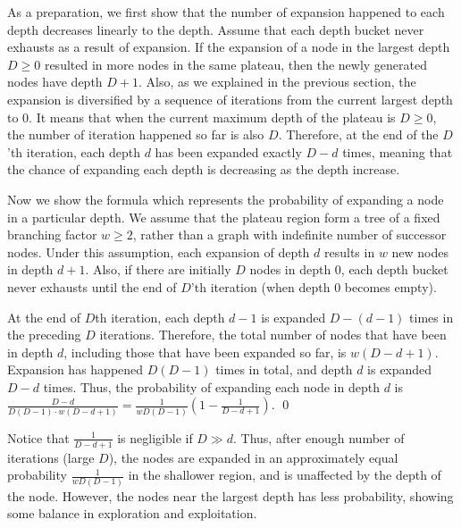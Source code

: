 As a preparation, we first show that the number of expansion happened to each depth decreases
linearly to the depth.
% 
Assume that each depth bucket never exhausts as a result of
expansion.  If the expansion of a node in the largest depth $D\geq 0$ resulted
in more nodes in the same plateau, then the newly generated nodes have
depth $D+1$.  Also, as we explained in the previous section, the
expansion is diversified by a sequence of iterations from the current
largest depth to 0.  It means that when the current maximum depth of
the plateau is $D\geq 0$, the number of iteration happened so far is also $D$.
Therefore, at the end of the $D$'th iteration, each depth $d$ has
been expanded exactly $D-d$ times, meaning that the chance of
expanding each depth is decreasing as the depth increase.

Now we show the formula which represents the probability of expanding a node in a particular depth.
We assume that the plateau region form a tree of a fixed branching factor
$w\geq 2$, rather than a graph with indefinite number of successor
nodes.  Under this assumption, each expansion of depth $d$ results in
$w$ new nodes in depth $d+1$. Also, if there are initially
$D$ nodes in depth 0, each depth bucket never exhausts until the end of $D$'th
iteration (when depth 0 becomes empty).

At the end of $D$th iteration,
each depth $d-1$ is expanded $D-(d-1)$ times in the preceding $D$ iterations.
Therefore, the total number of nodes that have been in depth $d$, including those
that have been expanded so far, is $w(D-d+1)$.
Expansion has happened $D(D-1)$ times in total, and depth $d$ is expanded $D-d$ times.
Thus, the probability of expanding each node in depth $d$ is
$\frac{D-d}{D(D-1)\cdot w(D-d+1)}=\frac{1}{wD(D-1)}(1-\frac{1}{D-d+1})$.  \qed

Notice that $\frac{1}{D-d+1}$ is negligible if $D \gg d$.
Thus, after enough number of iterations (large $D$), the nodes are 
expanded in an approximately equal probability $\frac{1}{wD(D-1)}$ in the shallower region, and is
unaffected by the depth of the node.
However, the nodes near the largest depth has less probability, showing
some balance in exploration and exploitation.

